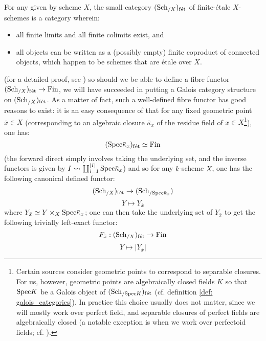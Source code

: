         \begin{remark} \label{remark: finite_etale_schemes}
            For any given by scheme $X$, the small category $(\mathrm{Sch}_{/X})_{\mathrm{f\acute{e}t}}$ of finite-\'etale $X$-schemes is a category wherein:
                \begin{itemize}
                    \item all finite limits and all finite colimits exist, and
                    \item all objects can be written as a (possibly empty) finite coproduct of connected objects, which happen to be schemes that are \'etale over $X$.  
                \end{itemize}
            (for a detailed proof, see \cite[\href{https://stacks.math.columbia.edu/tag/0BN9}{Tag 0BN9}]{stacks}) so should we be able to define a fibre functor $(\mathrm{Sch}_{/X})_{\mathrm{f\acute{e}t}} \to \mathrm{Fin}$, we will have succeeded in putting a Galois category structure on $(\mathrm{Sch}_{/X})_{\mathrm{f\acute{e}t}}$. As a matter of fact, such a well-defined fibre functor has good reasons to exist: it is an easy consequence of \cite[\href{https://stacks.math.columbia.edu/tag/00U3}{Tag 00U3}]{stacks} that for any fixed geometric point $\bar{x} \in X$ (corresponding to an algebraic closure $\bar{\kappa}_x$ of the residue field of $x \in X$\footnote{Certain sources consider geometric points to correspond to separable closures. For us, however, geometric points are algebraically closed fields $K$ so that $\mathrm{Spec} K$ be a Galois object of $(\mathrm{Sch}_{/\mathrm{Spec} K})_{\mathrm{f\acute{e}t}}$ (cf. definition \ref{def: galois_categories}). In practice this choice usually does not matter, since we will mostly work over perfect field, and separable closures of perfect fields are algebraically closed (a notable exception is when we work over perfectoid fields; cf. \cite{scholze2011perfectoid}).}), one has:
                $$(\mathrm{Spec} \bar{\kappa}_x)_{\mathrm{f\acute{e}t}} \simeq \mathrm{Fin}$$
            (the forward direct simply involves taking the underlying set, and the inverse functors is given by $I \leadsto \coprod_{i = 1}^{|I|} \mathrm{Spec} \bar{\kappa}_x$) and so for any $k$-scheme $X$, one has the following canonical defined functor:
                $$(\mathrm{Sch}_{/X})_{\mathrm{f\acute{e}t}} \to (\mathrm{Sch}_{/\mathrm{Spec} \bar{\kappa}_x})$$
                $$Y \mapsto Y_{\bar{x}}$$
            where $Y_{\bar{x}} \cong Y \x_X \Spec \bar{\kappa}_x$; one can then take the underlying set of $Y_{\bar{x}}$ to get the following trivially left-exact functor:
                $$F_{\bar{x}}: (\mathrm{Sch}_{/X})_{\mathrm{f\acute{e}t}} \to \mathrm{Fin}$$
                $$Y \mapsto |Y_{\bar{x}}|$$

\end{remark}
